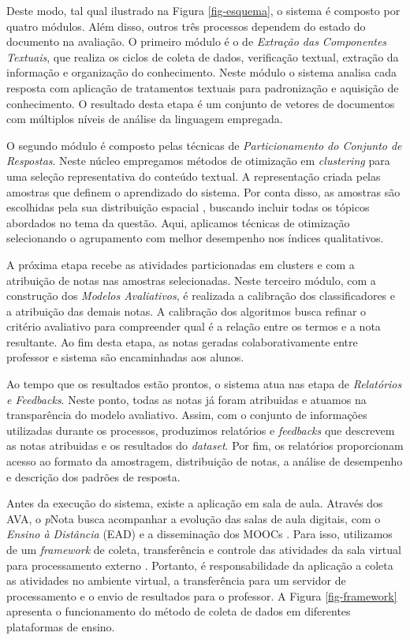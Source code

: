 Deste modo, tal qual ilustrado na Figura \ref{fig-esquema}, o sistema é composto por quatro módulos. Além disso, outros três processos dependem do estado do documento na avaliação. O primeiro módulo é o de \textit{Extração das Componentes Textuais}, que realiza os ciclos de coleta de dados, verificação textual, extração da informação e organização do conhecimento. Neste módulo o sistema analisa cada resposta com aplicação de tratamentos textuais para padronização e aquisição de conhecimento. O resultado desta etapa é um conjunto de vetores de documentos com múltiplos níveis de análise da linguagem empregada.

O segundo módulo é composto pelas técnicas de \textit{Particionamento do Conjunto de Respostas}. Neste núcleo empregamos métodos de otimização em \textit{clustering} para uma seleção representativa do conteúdo textual. A representação criada pelas amostras que definem o aprendizado do sistema. Por conta disso, as amostras são escolhidas pela sua distribuição espacial \cite{salton1975, baeza2011}, buscando incluir todas os tópicos abordados no tema da questão. Aqui, aplicamos técnicas de otimização selecionando o agrupamento com melhor desempenho nos índices qualitativos. 

A próxima etapa recebe as atividades particionadas em clusters e com a atribuição de notas nas amostras selecionadas. Neste terceiro módulo, com a construção dos \textit{Modelos Avaliativos}, é realizada a calibração dos classificadores e a atribuição das demais notas. A calibração dos algoritmos busca refinar o critério avaliativo para compreender qual é a relação entre os termos e a nota resultante. Ao fim desta etapa, as notas geradas colaborativamente entre professor e sistema são encaminhadas aos alunos.

Ao tempo que os resultados estão prontos, o sistema atua nas etapa de \textit{Relatórios e Feedbacks}. Neste ponto, todas as notas já foram atribuidas e atuamos na transparência do modelo avaliativo. Assim, com o conjunto de informações utilizadas durante os processos, produzimos relatórios e \textit{feedbacks} que descrevem as notas atribuidas e os resultados do \textit{dataset}. Por fim, os relatórios proporcionam acesso ao formato da amostragem, distribuição de notas, a análise de desempenho e descrição dos padrões de resposta. 

Antes da execução do sistema, existe a aplicação em sala de aula. Através dos AVA, o \textit{p}Nota busca acompanhar a evolução das salas de aula digitais, com o \textit{Ensino à Distância} (EAD) e a disseminação dos MOOCs \cite{mohapatra2017}. Para isso, utilizamos de um \textit{framework} de coleta, transferência e controle das atividades da sala virtual para processamento externo \cite{spalenza2018}. Portanto, é responsabilidade da aplicação a coleta as atividades no ambiente virtual, a transferência para um servidor de processamento e o envio de resultados para o professor. A Figura \ref{fig-framework} apresenta o funcionamento do método de coleta de dados em diferentes plataformas de ensino.


